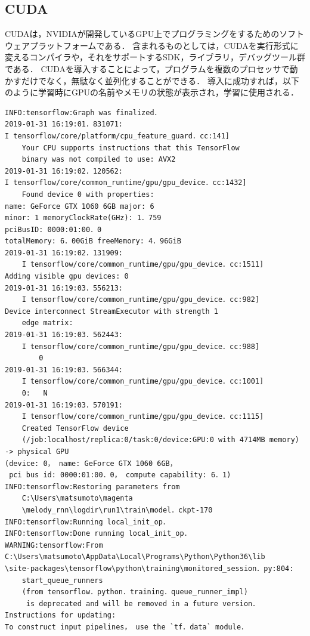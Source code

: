 \subsection{CUDA}
CUDAは，NVIDIAが開発しているGPU上でプログラミングをするためのソフトウェアプラットフォームである．
含まれるものとしては，CUDAを実行形式に変えるコンパイラや，それをサポートするSDK，ライブラリ，デバッグツール群である．
CUDAを導入することによって，プログラムを複数のプロセッサで動かすだけでなく，無駄なく並列化することができる．
導入に成功すれば，以下のように学習時にGPUの名前やメモリの状態が表示され，学習に使用される．
\begin{lstlisting}[basicstyle=\ttfamily\footnotesize，frame=single]
INFO:tensorflow:Graph was finalized．
2019-01-31 16:19:01．831071: 
I tensorflow/core/platform/cpu_feature_guard．cc:141]
    Your CPU supports instructions that this TensorFlow
    binary was not compiled to use: AVX2
2019-01-31 16:19:02．120562: 
I tensorflow/core/common_runtime/gpu/gpu_device．cc:1432]
    Found device 0 with properties:
name: GeForce GTX 1060 6GB major: 6 
minor: 1 memoryClockRate(GHz): 1．759
pciBusID: 0000:01:00．0
totalMemory: 6．00GiB freeMemory: 4．96GiB
2019-01-31 16:19:02．131909:
    I tensorflow/core/common_runtime/gpu/gpu_device．cc:1511] 
Adding visible gpu devices: 0
2019-01-31 16:19:03．556213:
    I tensorflow/core/common_runtime/gpu/gpu_device．cc:982]
Device interconnect StreamExecutor with strength 1
    edge matrix:
2019-01-31 16:19:03．562443:
    I tensorflow/core/common_runtime/gpu/gpu_device．cc:988]
        0
2019-01-31 16:19:03．566344:
    I tensorflow/core/common_runtime/gpu/gpu_device．cc:1001]
    0:   N
2019-01-31 16:19:03．570191:
    I tensorflow/core/common_runtime/gpu/gpu_device．cc:1115]
    Created TensorFlow device
    (/job:localhost/replica:0/task:0/device:GPU:0 with 4714MB memory)
-> physical GPU 
(device: 0， name: GeForce GTX 1060 6GB，
 pci bus id: 0000:01:00．0， compute capability: 6．1)
INFO:tensorflow:Restoring parameters from
    C:\Users\matsumoto\magenta
    \melody_rnn\logdir\run1\train\model．ckpt-170
INFO:tensorflow:Running local_init_op．
INFO:tensorflow:Done running local_init_op．
WARNING:tensorflow:From 
C:\Users\matsumoto\AppData\Local\Programs\Python\Python36\lib
\site-packages\tensorflow\python\training\monitored_session．py:804:
    start_queue_runners 
    (from tensorflow．python．training．queue_runner_impl)
     is deprecated and will be removed in a future version．
Instructions for updating:
To construct input pipelines， use the `tf．data` module．
\end{lstlisting}
